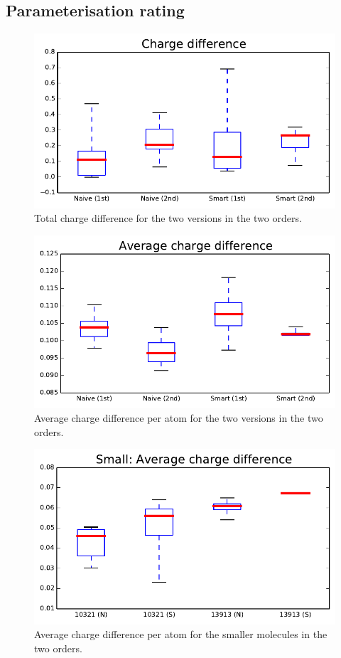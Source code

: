 \subsection{Parameterisation rating}
\nlipsum

\begin{figure}
\center
\includegraphics[width=.9\textwidth]{img/graphs/1a_00.pdf}
\caption{Total charge difference for the two versions in the two orders.}
\end{figure}

\begin{figure}
\center
\includegraphics[width=.9\textwidth]{img/graphs/1a_01.pdf}
\caption{Average charge difference per atom for the two versions in the two orders.}
\end{figure}

\begin{figure}
\center
\includegraphics[width=.9\textwidth]{img/graphs/1b_01.pdf}
\caption{Average charge difference per atom for the smaller molecules in the two orders.}
\end{figure}

